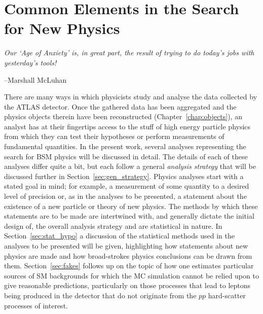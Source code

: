 \chapter{Common Elements in the Search for New Physics}
\label{chap:common_search}

\epigraph{
\textit{Our `Age of Anxiety' is, in great part, the result of trying to do today's jobs with yesterday's tools!}
}{--Marshall McLuhan}



There are many ways in which physicists study and analyse the data collected by
the ATLAS detector.
Once the gathered data has been aggregated and the physics objects therein
have been reconstructed (Chapter~\ref{chap:objects}), an analyst has at their fingertips access
to the stuff of high energy particle physics from which they
can test their hypotheses or perform measurements of fundamental quantities.
In the present work, several analyses representing the search for BSM physics
will be discussed in detail.
The details of each of these analyses differ quite a bit, but each follow
a general \textit{analysis strategy} that will be discussed
further in Section~\ref{sec:gen_strategy}.
Physics analyses start with a stated goal in mind; for example,
a measurement of some quantity to a desired level of precision
or, as in the analyses to be presented, a statement about the existence of a new particle or theory of new physics.
The methods by which these statements are to be made are intertwined with, and generally
dictate the initial design of, the overall
analysis strategy and are statistical in nature.
In Section~\ref{sec:stat_hypo} a discussion of the statistical methods used
in the analyses to be presented will be given, highlighting how statements about
new physics are made and how broad-strokes physics conclusions can be drawn from them.
Section~\ref{sec:fakes} follows up on the topic of how one estimates particular sources
of SM backgrounds for which the MC simulation cannot be relied upon to give reasonable
predictions, particularly on those processes that lead to leptons being produced in the detector
that do not originate from the $pp$ hard-scatter processes of interest.

